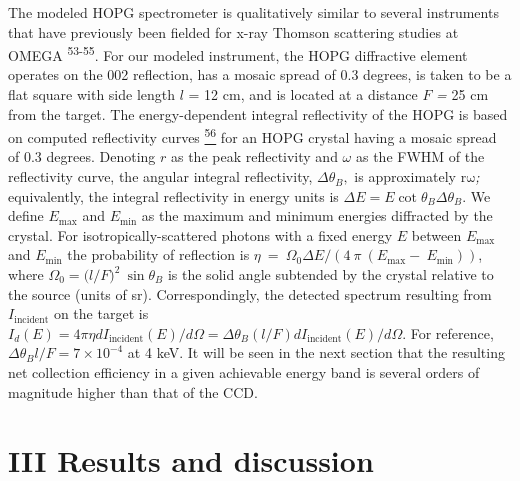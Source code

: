 The modeled HOPG spectrometer is qualitatively similar to several
instruments that have previously been fielded for x-ray Thomson
scattering studies at OMEGA \textsuperscript{53-55}. For our modeled
instrument, the HOPG diffractive element operates on the 002 reflection,
has a mosaic spread of 0.3 degrees, is taken to be a flat square with
side length \(l\) = 12 cm, and is located at a distance \(F\) \emph{=}
25 cm from the target. The energy-dependent integral reflectivity of the
HOPG is based on computed reflectivity curves
\hyperref[a.-k.-freund-a.-munkholm-and-s.-brennan-optics-for-high-brightness-synchrotron-radiation-beamlines-ii-2856-68-1996.]{\textsuperscript{56}}
for an HOPG crystal having a mosaic spread of 0.3 degrees. Denoting
\(r\) as the peak reflectivity and \(\omega\) as the FWHM of the
reflectivity curve, the angular integral reflectivity,
\(\Delta\theta_{B},\) is approximately \(\text{rω}\)\emph{;}
equivalently, the integral reflectivity in energy units is
\(\Delta E = E\cot{\theta_{B}\Delta\theta_{B}}\). We define \(E_{\max}\)
and \(E_{\min}\) as the maximum and minimum energies diffracted by the
crystal. For isotropically-scattered photons with a fixed energy \(E\)
between \(E_{\max}\) and \(E_{\min}\) the probability of reflection is
\(\eta\  = \ \Omega_{0}\Delta E/(4\ \pi\ \left( E_{\max} - \ E_{\min} \right))\),
where \(\Omega_{0} = ({l/F)}^{2}\ \sin\theta_{B}\) is the solid angle
subtended by the crystal relative to the source (units of sr).
Correspondingly, the detected spectrum resulting from
\(I_{\text{incident}}\) on the target is
\(I_{d}\left( E \right) = 4\pi\eta dI_{\text{incident}}\left( E \right)/d\Omega = \Delta\theta_{B}(l/F)dI_{\text{incident}}\left( E \right)/d\Omega\).
For reference, \(\Delta\theta_{B}l/F = 7 \times 10^{- 4}\) at 4 keV. It
will be seen in the next section that the resulting net collection
efficiency in a given achievable energy band is several orders of
magnitude higher than that of the CCD.

\section{III Results and
discussion}\label{iii-results-and-discussion}


